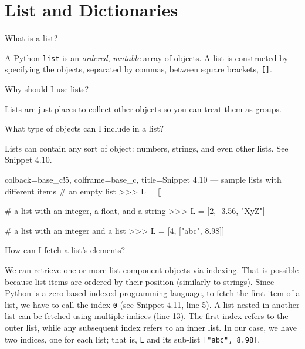 \documentclass[a4paper,11pt]{book}
\newcommand{\question}[1]{%
    \begin{tcolorbox}[colback=comp_c!10,colframe=comp_c,sidebyside align=top,width=\linewidth,before skip=1ex]
        #1
    \end{tcolorbox}
    \switchcolumn%
}
\newcommand{\note}[1]{%
    \begin{tcolorbox}[colback=white!0,colframe=white!10,width=\linewidth,before skip=1ex]
        #1
    \end{tcolorbox}
}
\begin{document}
\section{List and Dictionaries}

\begin{paracol}{2}
	\question{\raggedright What is a list?}
		\note{A Python \href{https://docs.python.org/3/tutorial/datastructures.html}{\texttt{list}} is an \emph{ordered}, \emph{mutable} array of objects. A list is constructed by specifying the objects, separated by commas, between square brackets, \texttt{[]}.}
\end{paracol}

\begin{paracol}{2}
	\question{\raggedright Why should I use lists?}
	\note{Lists are just places to collect other objects so you can treat them as groups.}
\end{paracol}

\begin{paracol}{2}
	\question{\raggedright What type of objects can I include in a list?}
	\note{Lists can contain any sort of object: numbers, strings, and even other lists. See Snippet 4.10.}
\end{paracol}

\begin{pythoncode}[linenos=true,]{colback=base_c!5, colframe=base_c, title=\sffamily Snippet 4.10 --- sample lists with different items}
# an empty list
>>> L = [] 

# a list with an integer, a float, and a string
>>> L = [2, -3.56, "XyZ"]

# a list with an integer and a list
>>> L = [4, ["abc", 8.98]]

\end{pythoncode}

\begin{paracol}{2}
	\question{\raggedright How can I fetch a list's elements?}
	\note{We can retrieve one or more list component objects via indexing. That is possible because list items are ordered by their position  (similarly to strings). Since Python is a zero-based indexed programming language, to fetch the first item of a list, we have to call the index \texttt{0} (see Snippet 4.11, line 5). A list nested in another list can be fetched using multiple indices (line 13). The first index refers to the outer list, while any subsequent index refers to an inner list. In our case, we have two indices, one for each list; that is, \texttt{L} and its sub-list \texttt{["abc", 8.98]}.}
\end{paracol}
\clearpage
\end{document}
